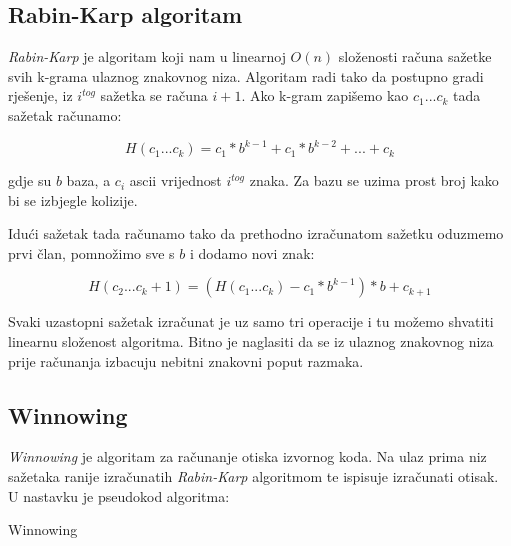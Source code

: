 \subsection{Rabin-Karp algoritam}

\textit{Rabin-Karp} je algoritam koji nam u linearnoj $O(n)$ složenosti računa sažetke svih k-grama ulaznog znakovnog niza. Algoritam radi tako da postupno gradi rješenje, iz $i^{tog}$ sažetka se računa $i+1$. Ako k-gram zapišemo kao $c_1...c_k$ tada sažetak računamo:

\begin{equation}
	H(c_1...c_k) = c_1 * b^{k-1} + c_1 * b^{k-2} + ... + c_k
\end{equation}

\noindent gdje su $b$ baza, a $c_i$ ascii vrijednost $i^{tog}$ znaka. Za bazu se uzima prost broj kako bi se izbjegle kolizije.

\noindent Idući sažetak tada računamo tako da prethodno izračunatom sažetku oduzmemo prvi član, pomnožimo sve s $b$ i dodamo novi znak:
	
\begin{equation}
	H(c_2...c_k+1) = (H(c_1...c_k) - c_1 * b^{k-1}) * b + c_{k+1}
\end{equation}

\noindent Svaki uzastopni sažetak izračunat je uz samo tri operacije i tu možemo shvatiti linearnu složenost algoritma. Bitno je naglasiti da se iz ulaznog znakovnog niza prije računanja izbacuju nebitni znakovni poput razmaka.
\newpage

\subsection{Winnowing}

\textit{Winnowing} je algoritam za računanje otiska izvornog koda. Na ulaz prima niz sažetaka ranije izračunatih \textit{Rabin-Karp} algoritmom te ispisuje izračunati otisak. U nastavku je pseudokod algoritma:

\begin{algorithm}
\caption{Winnowing}

\begin{algorithmic}
		\ENDIF
	\ENDIF
\ENDFOR
{}

\end{algorithmic}
\end{algorithm}

